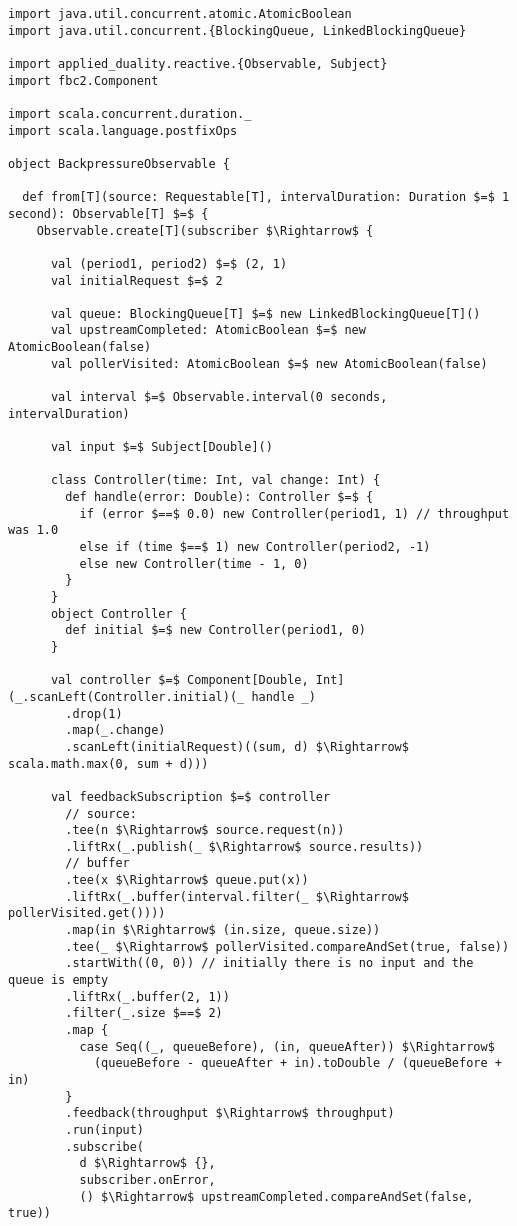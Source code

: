 \begin{lstlisting}[style=ScalaStyle, caption={Implementation of \code{BackpressureObservable}}]
import java.util.concurrent.atomic.AtomicBoolean
import java.util.concurrent.{BlockingQueue, LinkedBlockingQueue}

import applied_duality.reactive.{Observable, Subject}
import fbc2.Component

import scala.concurrent.duration._
import scala.language.postfixOps

object BackpressureObservable {

  def from[T](source: Requestable[T], intervalDuration: Duration $=$ 1 second): Observable[T] $=$ {
    Observable.create[T](subscriber $\Rightarrow$ {

      val (period1, period2) $=$ (2, 1)
      val initialRequest $=$ 2

      val queue: BlockingQueue[T] $=$ new LinkedBlockingQueue[T]()
      val upstreamCompleted: AtomicBoolean $=$ new AtomicBoolean(false)
      val pollerVisited: AtomicBoolean $=$ new AtomicBoolean(false)

      val interval $=$ Observable.interval(0 seconds, intervalDuration)

      val input $=$ Subject[Double]()

      class Controller(time: Int, val change: Int) {
        def handle(error: Double): Controller $=$ {
          if (error $==$ 0.0) new Controller(period1, 1) // throughput was 1.0
          else if (time $==$ 1) new Controller(period2, -1)
          else new Controller(time - 1, 0)
        }
      }
      object Controller {
        def initial $=$ new Controller(period1, 0)
      }

      val controller $=$ Component[Double, Int](_.scanLeft(Controller.initial)(_ handle _)
        .drop(1)
        .map(_.change)
        .scanLeft(initialRequest)((sum, d) $\Rightarrow$ scala.math.max(0, sum + d)))

      val feedbackSubscription $=$ controller
        // source:
        .tee(n $\Rightarrow$ source.request(n))
        .liftRx(_.publish(_ $\Rightarrow$ source.results))
        // buffer
        .tee(x $\Rightarrow$ queue.put(x))
        .liftRx(_.buffer(interval.filter(_ $\Rightarrow$ pollerVisited.get())))
        .map(in $\Rightarrow$ (in.size, queue.size))
        .tee(_ $\Rightarrow$ pollerVisited.compareAndSet(true, false))
        .startWith((0, 0)) // initially there is no input and the queue is empty
        .liftRx(_.buffer(2, 1))
        .filter(_.size $==$ 2)
        .map {
          case Seq((_, queueBefore), (in, queueAfter)) $\Rightarrow$
            (queueBefore - queueAfter + in).toDouble / (queueBefore + in)
        }
        .feedback(throughput $\Rightarrow$ throughput)
        .run(input)
        .subscribe(
          d $\Rightarrow$ {},
          subscriber.onError,
          () $\Rightarrow$ upstreamCompleted.compareAndSet(false, true))


\end{lstlisting}
